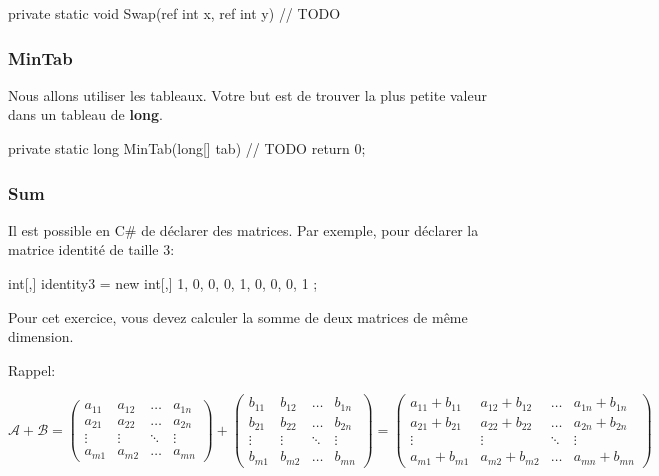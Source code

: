 \begin{code}
private static void Swap(ref int x, ref int y)
{
	// TODO
}
\end{code}

\subsubsection{MinTab}

Nous allons utiliser les tableaux. Votre but est de trouver la plus petite valeur
dans un tableau de \textbf{long}.

\begin{code}
private static long MinTab(long[] tab)
{
	// TODO
    return 0;
}
\end{code}

\subsubsection{Sum}

Il est possible en C\# de déclarer des matrices. 
Par exemple, pour déclarer la matrice identité de taille 3:

\begin{code}
int[,] identity3 = new int[,]
{
    {1, 0, 0},
    {0, 1, 0},
    {0, 0, 1}
};
\end{code}

Pour cet exercice, vous devez calculer la somme de deux matrices de même dimension.

Rappel:

$$
\mathcal{A} + \mathcal{B} = \begin{pmatrix}
   a_{11} & a_{12}  & \dots & a_{1n}\\
   a_{21} & a_{22}  & \dots & a_{2n}\\
   \vdots & \vdots & \ddots & \vdots \\
   a_{m1} & a_{m2} & \dots &  a_{mn}
 \end{pmatrix} + \begin{pmatrix}
   b_{11} & b_{12}  & \dots & b_{1n}\\
   b_{21} & b_{22}  & \dots & b_{2n}\\
   \vdots & \vdots & \ddots & \vdots \\
   b_{m1} & b_{m2} & \dots &  b_{mn}
 \end{pmatrix} = \begin{pmatrix}
   a_{11} + b_{11} & a_{12} + b_{12}  & \dots & a_{1n} + b_{1n}\\
   a_{21} + b_{21} & a_{22} + b_{22}  & \dots & a_{2n} + b_{2n}\\
   \vdots & \vdots & \ddots & \vdots \\
   a_{m1} + b_{m1} & a_{m2} + b_{m2} & \dots &  a_{mn} + b_{mn}
 \end{pmatrix}
$$

